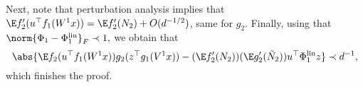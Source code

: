 Next, note that perturbation analysis implies that \(\E f_2'(u^\top f_1(W^1 x)) = \E f_2'(N_2) + O(d^{-1/2})\), same for \(g_2\). Finally, using that \(\norm{\Phi_1 - \Phi_1^{\mathrm{lin}}}_F \prec 1,\) we obtain that
\begin{equation}
    \abs{\E f_2(u^{\top} f_1(W^1x)) g_2(z^{\top} g_1(V^1x)) - (\E f_2' (N_2)) (\E g_2' (\tilde N_2))  u^\top \Phi_1^{\mathrm{lin}} z} \prec d^{-1},
\end{equation}
which finishes the proof.
